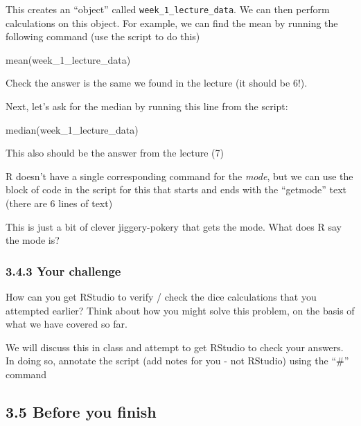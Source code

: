 \documentclass[
]{book}
\newenvironment{Shaded}{\begin{snugshade}}{\end{snugshade}}
\newcommand{\FunctionTok}[1]{\textcolor[rgb]{0.00,0.00,0.00}{#1}}
\newcommand{\NormalTok}[1]{#1}
\begin{document}
This creates an ``object'' called \texttt{week\_1\_lecture\_data}. We can then perform calculations on this object. For example, we can find the mean by running the following command (use the script to do this)

\begin{Shaded}
\begin{Highlighting}[]
\FunctionTok{mean}\NormalTok{(week\_1\_lecture\_data)}
\end{Highlighting}
\end{Shaded}

Check the answer is the same we found in the lecture (it should be 6!).

Next, let's ask for the median by running this line from the script:

\begin{Shaded}
\begin{Highlighting}[]
\FunctionTok{median}\NormalTok{(week\_1\_lecture\_data)}
\end{Highlighting}
\end{Shaded}

This also should be the answer from the lecture (7)

R doesn't have a single corresponding command for the \emph{mode}, but we can use the block of code in the script for this that starts and ends with the ``getmode'' text (there are 6 lines of text)

This is just a bit of clever jiggery-pokery that gets the mode. What does R say the mode is?

\hypertarget{your-challenge}{%
\subsubsection{3.4.3 Your challenge}\label{your-challenge}}

How can you get RStudio to verify / check the dice calculations that you attempted earlier? Think about how you might solve this problem, on the basis of what we have covered so far.

We will discuss this in class and attempt to get RStudio to check your answers. In doing so, annotate the script (add notes for you - not RStudio) using the ``\#'' command

\hypertarget{before-you-finish}{%
\subsection{3.5 Before you finish}\label{before-you-finish}}
\end{document}
